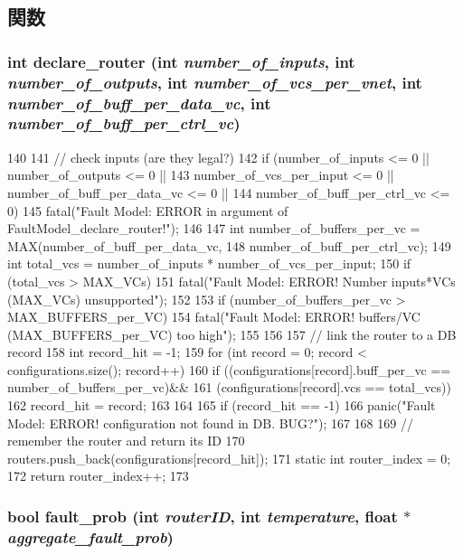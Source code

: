 \subsection{関数}
\hypertarget{classFaultModel_a9b0afb8ab704de6844484a41ecbad75f}{
\subsubsection[{declare\_\-router}]{\setlength{\rightskip}{0pt plus 5cm}int declare\_\-router (int {\em number\_\-of\_\-inputs}, \/  int {\em number\_\-of\_\-outputs}, \/  int {\em number\_\-of\_\-vcs\_\-per\_\-vnet}, \/  int {\em number\_\-of\_\-buff\_\-per\_\-data\_\-vc}, \/  int {\em number\_\-of\_\-buff\_\-per\_\-ctrl\_\-vc})}}
\label{classFaultModel_a9b0afb8ab704de6844484a41ecbad75f}



\begin{DoxyCode}
140 {
141     // check inputs (are they legal?)
142     if (number_of_inputs <= 0 || number_of_outputs <= 0 ||
143         number_of_vcs_per_input <= 0 || number_of_buff_per_data_vc <= 0 || 
144         number_of_buff_per_ctrl_vc <= 0){
145         fatal("Fault Model: ERROR in argument of FaultModel_declare_router!");
146     }
147     int number_of_buffers_per_vc = MAX(number_of_buff_per_data_vc,
148                                        number_of_buff_per_ctrl_vc);
149     int total_vcs = number_of_inputs * number_of_vcs_per_input;
150     if (total_vcs > MAX_VCs){
151         fatal("Fault Model: ERROR! Number inputs*VCs (MAX_VCs) unsupported");
152     }
153     if (number_of_buffers_per_vc > MAX_BUFFERS_per_VC){
154         fatal("Fault Model: ERROR! buffers/VC (MAX_BUFFERS_per_VC) too high");
155     }
156 
157     // link the router to a DB record
158     int record_hit = -1;
159     for (int record = 0; record < configurations.size(); record++){    
160         if ((configurations[record].buff_per_vc == number_of_buffers_per_vc)&&
161             (configurations[record].vcs == total_vcs)){
162             record_hit = record;
163         }
164     }
165     if (record_hit == -1){
166         panic("Fault Model: ERROR! configuration not found in DB. BUG?");
167     }
168 
169     // remember the router and return its ID
170     routers.push_back(configurations[record_hit]);
171     static int router_index = 0;
172     return router_index++;
173 }
\end{DoxyCode}
\hypertarget{classFaultModel_ac7d54b266bf5b3e7b3054fdd875d89df}{
\subsubsection[{fault\_\-prob}]{\setlength{\rightskip}{0pt plus 5cm}bool fault\_\-prob (int {\em routerID}, \/  int {\em temperature}, \/  float $\ast$ {\em aggregate\_\-fault\_\-prob})}}
\label{classFaultModel_ac7d54b266bf5b3e7b3054fdd875d89df}



